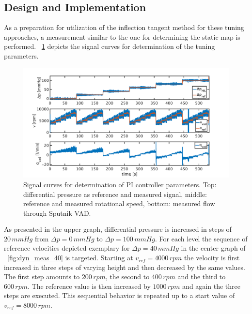 \subsection{Design and Implementation}
As a preparation for utilization of the inflection tangent method for these tuning approaches, a measurement similar to the one for determining the static map is performed. \figurename~\ref{fig:dyn_meas} depicts the signal curves for determination of the tuning parameters.
\begin{figure}[ht]
  \centering
  \includegraphics[width=\textwidth]{images/chapt_5/dyn_measure.pdf}
  \caption[Signal curves for determination of PI controller parameters]{Signal curves for determination of PI controller parameters. Top: differential pressure as reference and measured signal, middle: reference and measured rotational speed, bottom: measured flow through Sputnik VAD.}
  \label{fig:dyn_meas}
\end{figure}
As presented in the upper graph, differential pressure is increased in steps of $20\,mmHg$ from $\Delta{p}=0\,mmHg$ to $\Delta{p}=100\,mmHg$. For each level the sequence of reference velocities depicted exemplary for $\Delta{p}=40\,mmHg$ in the center graph of \figurename~\ref{fig:dyn_meas_40} is targeted. Starting at $v_{ref}=4000 \, rpm $ the velocity is first increased in three steps of varying height and then decreased by the same values. The first step amounts to $200 \, rpm$, the second to $400\,rpm$ and the third to $600 \, rpm$. The reference value is then increased by $1000\,rpm$ and again the three steps are executed. This sequential behavior is repeated up to a start value of $v_{ref}=8000\,rpm$.
